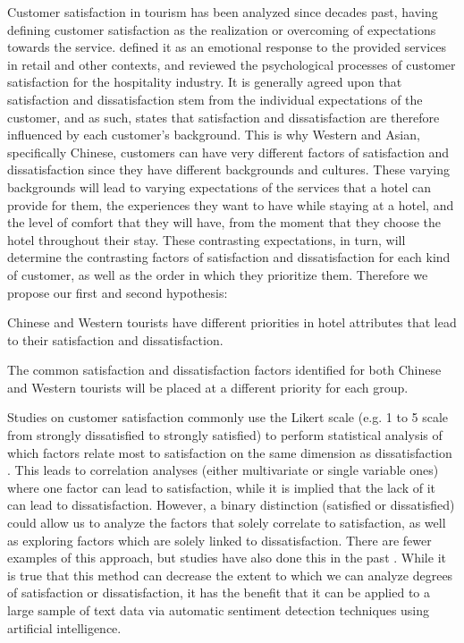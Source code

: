 Customer satisfaction in tourism has been analyzed since decades past, \cite{hunt1975} having defining customer satisfaction as the realization or overcoming of expectations towards the service. \cite{oliver1981} defined it as an emotional response to the provided services in retail and other contexts, and \cite{oh1996} reviewed the psychological processes of customer satisfaction for the hospitality industry. It is generally agreed upon that satisfaction and dissatisfaction stem from the individual expectations of the customer, and as such, \cite{engel1990} states that satisfaction and dissatisfaction are therefore influenced by each customer's background. This is why Western and Asian, specifically Chinese, customers can have very different factors of satisfaction and dissatisfaction since they have different backgrounds and cultures. These varying backgrounds will lead to varying expectations of the services that a hotel can provide for them, the experiences they want to have while staying at a hotel, and the level of comfort that they will have, from the moment that they choose the hotel throughout their stay. These contrasting expectations, in turn, will determine the contrasting factors of satisfaction and dissatisfaction for each kind of customer, as well as the order in which they prioritize them.
Therefore we propose our first and second hypothesis:

\begin{hyp}
\label{hyp:1}
Chinese and Western tourists have different priorities in hotel attributes that lead to their satisfaction and dissatisfaction.
\end{hyp}

\begin{hyp}
\label{hyp:2}
The common satisfaction and dissatisfaction factors identified for both Chinese and Western tourists will be placed at a different priority for each group.
\end{hyp}

Studies on customer satisfaction \cite[e.g.][]{truong2009, romao2014, wu2009} commonly use the Likert scale \cite[][]{likert1932technique} (e.g. 1 to 5 scale from strongly dissatisfied to strongly satisfied) to perform statistical analysis of which factors relate most to satisfaction on the same dimension as dissatisfaction \cite[e.g.][]{chan201518, choi2000}. This leads to correlation analyses (either multivariate or single variable ones) where one factor can lead to satisfaction, while it is implied that the lack of it can lead to dissatisfaction. However, a binary distinction (satisfied or dissatisfied) could allow us to analyze the factors that solely correlate to satisfaction, as well as exploring factors which are solely linked to dissatisfaction. There are fewer examples of this approach, but studies have also done this in the past \cite[e.g.][]{zhou2014}. While it is true that this method can decrease the extent to which we can analyze degrees of satisfaction or dissatisfaction, it has the benefit that it can be applied to a large sample of text data via automatic sentiment detection techniques using artificial intelligence. 

